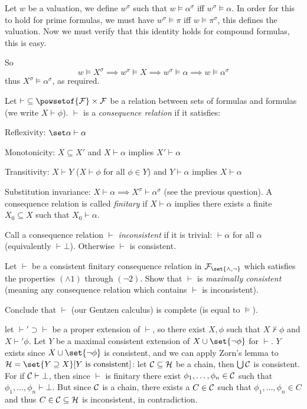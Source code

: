 \eprob

Let $w$ be a valuation, we define $w^\sigma$ such that $w\vDash\alpha^\sigma$ iff $w^\sigma\vDash\alpha$.
In order for this to hold for prime formulas, we must have $w^\sigma\vDash\pi$ iff $w\vDash\pi^\sigma$, this defines the valuation.
Now we must verify that this identity holds for compound formulas, this is easy.

So
$$ w\vDash X^\sigma \implies w^\sigma\vDash X \implies w^\sigma\vDash\alpha \implies w\vDash\alpha^\sigma $$
thus $X^\sigma\vDash\alpha^\sigma$, as required.

\bprob

    Let ${\vdash}\subseteq\powsetof{\cal F}\times{\cal F}$ be a relation between sets of formulas
    and formulas (we write $X\vdash\phi$).
    $\vdash$ is a {\it consequence relation} if it satisfies:
    \benum
        \item Reflexivity: $\set\alpha\vdash\alpha$
        \item Monotonicity: $X\subseteq X'$ and $X\vdash\alpha$ implies $X'\vdash\alpha$
        \item Transitivity: $X\vdash Y$ ($X\vdash\phi$ for all $\phi\in Y$) and $Y\vdash\alpha$
        implies $X\vdash\alpha$
        \item Substitution invariance: $X\vdash\alpha\implies X^\sigma\vdash\alpha^\sigma$ (see
        the previous question).
    \eenum
    A consequence relation is called {\it finitary} if $X\vdash\alpha$ implies there exists a
    finite $X_0\subseteq X$ such that $X_0\vdash\alpha$.

    Call a consequence relation $\vdash$ {\it inconsistent} if it is trivial: $\vdash\alpha$ for
    all $\alpha$ (equivalently $\vdash\bot$).
    Otherwise $\vdash$ is consistent.

    \benum
        \item Let $\vdash$ be a consistent finitary consequence relation in
        ${\cal F}_{\set{{\land},{\neg}}}$ which satisfies the properties $(\land1)$ through
        $(\neg2)$.
        Show that $\vdash$ is {\it maximally consistent} (meaning any consequence relation which
        contains $\vdash$ is inconsistent).
        \item Conclude that $\vdash$ (our Gentzen calculus) is complete (is equal to $\vDash$).
    \eenum

\eprob

\benum
    \item let ${\vdash}'\supset\vdash$ be a proper extension of $\vdash$, so there exist $X,\phi$ such that $X\nvdash\phi$ and $X\vdash'\phi$.
    Let $Y$ be a maximal consistent extension of $X\cup\set{\neg\phi}$ for $\vdash$.
    $Y$ exists since $X\cup\set{\neg\phi}$ is consistent, and we can apply Zorn's lemma to $\c H=\set{Y\supseteq X}[Y\hbox{ is consistent}]$: let ${\cal C}\subseteq{\cal H}$ be a chain, then $\bigcup{\cal C}$ is
    consistent.
    For if ${\cal C}\vdash\bot$, then since $\vdash$ is finitary there exist $\phi_1,\dots,\phi_n\in{\cal C}$ such that $\phi_1,\dots,\phi_n\vdash\bot$.
    But since ${\cal C}$ is a chain, there exists a $C\in{\cal C}$ such that $\phi_1,\dots,\phi_n\in C$ and thus $C\in{\cal C}\subseteq{\cal H}$ is inconsistent, in contradiction.

